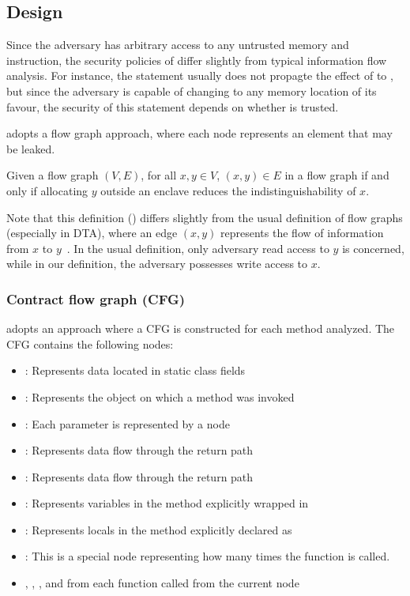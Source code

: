 \subsection{Design}\label{subsec:design}
Since the adversary has arbitrary access to any untrusted memory and instruction,
the security policies of \pname{} differ slightly from typical information flow analysis.
For instance, the statement  usually
does not propagte the effect of  to ,
but since the adversary is capable of changing  to any memory location of its favour,
the security of this statement depends on whether  is trusted.

\pname{} adopts a flow graph approach,
where each node represents an element that may be leaked.

\begin{defin}
	Given a flow graph $(V, E)$, for all $x, y \in V$,
	$(x, y) \in E$ in a flow graph if and only if
	allocating $y$ outside an enclave reduces the indistinguishability of $x$.
\end{defin}

Note that this definition () differs slightly from
the usual definition of flow graphs (especially in DTA),
where an edge $(x, y)$ represents the flow of information from $x$ to $y$~\cite{YinHeng2007Pcsi}.
In the usual definition, only adversary read access to $y$ is concerned,
while in our definition, the adversary possesses write access to $x$.

\subsubsection{Contract flow graph (CFG)}
\pname{} adopts an approach where a CFG is constructed for each method analyzed.
The CFG contains the following nodes:
\begin{itemize}
	\item {}: Represents data located in static class fields
	\item {}: Represents the object on which a method was invoked
	\item {}: Each parameter is represented by a node
	\item {}: Represents data flow through the return path
	\item {}: Represents data flow through the return path
	\item {}: Represents variables in the method explicitly wrapped in 
	\item {}: Represents locals in the method explicitly declared as 
	\item {}: This is a special node representing how many times the function is called.
	\item {}, , ,  and 
		from each function called from the current node
\end{itemize}

